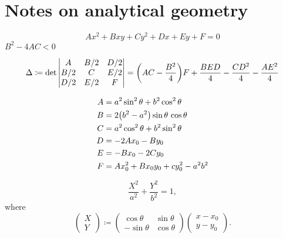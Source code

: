 \section{Notes on analytical geometry}

\begin{equation}
Ax^2+Bxy+Cy^2+Dx+Ey+F = 0
\end{equation}
$ B^2 - 4AC < 0$

\begin{equation}
\Delta \coloneqq \det\begin{vmatrix}
A & B/2 & D/2 \\
B/2 & C & E/2 \\
D/2 & E/2 & F
\end{vmatrix} = 
{\left(AC-\frac{B^2}{4}\right)}F+\frac{BED}{4}-\frac{CD^2}{4}-\frac{AE^2}{4}
\end{equation}

\begin{equation}
\begin{aligned}
A &= a^2\sin^2\theta+b^2\cos^2\theta \\
B &= 2{\left(b^2 - a^2\right)}\sin\theta\,\cos\theta \\
C &= a^2\cos^2\theta+b^2\sin^2\theta \\
D &=-2A x_0 - By_0 \\
E &= -B x_0 - 2C y_0 \\
F &= A x_0^2 + Bx_0 y_0 + cy_0^2 - a^2 b^2
\end{aligned}
\end{equation}

\begin{equation}
\frac{X^2}{a^2}+\frac{Y^2}{b^2} = 1,
\end{equation}
where
\begin{equation}
	\begin{pmatrix} X \\ Y \end{pmatrix} \coloneqq
	\begin{pmatrix}
	\cos\theta & \sin\theta \\ -\sin\theta & \cos\theta
	\end{pmatrix}
	\begin{pmatrix} x-x_0 \\ y-y_0 \end{pmatrix}.
\end{equation}

